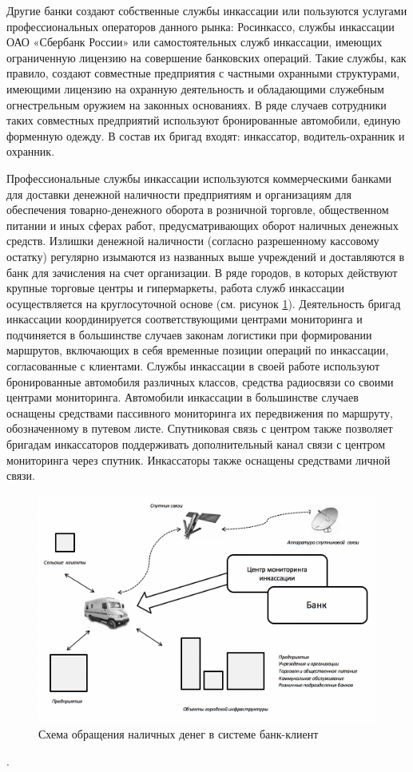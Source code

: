 \documentclass[a4paper,12pt,fleqn]{article} %
\begin{document}
Другие банки создают собственные службы инкассации или пользуются услугами профессиональных операторов данного рынка: Росинкассо, службы инкассации ОАО «Сбербанк России» или самостоятельных служб инкассации, имеющих ограниченную лицензию на совершение банковских операций. Такие службы, как правило, создают совместные предприятия с частными охранными структурами, имеющими лицензию на охранную деятельность и обладающими служебным огнестрельным оружием на законных основаниях. В ряде случаев сотрудники таких совместных предприятий используют бронированные автомобили, единую форменную одежду. В состав их бригад входят: инкассатор, водитель-охранник и охранник.

Профессиональные службы инкассации используются коммерческими банками для доставки денежной наличности предприятиям и организациям для обеспечения товарно-денежного оборота в розничной торговле, общественном питании и иных сферах работ, предусматривающих оборот наличных денежных средств. Излишки денежной наличности (согласно разрешенному кассовому остатку) регулярно изымаются из названных выше учреждений и доставляются в банк для зачисления на счет организации. В ряде городов, в которых действуют крупные торговые центры и гипермаркеты, работа служб инкассации осуществляется на круглосуточной основе (см. рисунок \ref{image10}). Деятельность бригад инкассации координируется соответствующими центрами мониторинга и подчиняется в большинстве случаев законам логистики при формировании маршрутов, включающих в себя временные позиции операций по инкассации, согласованные с клиентами. Службы инкассации в своей работе используют бронированные автомобиля различных классов, средства радиосвязи со своими центрами мониторинга. Автомобили инкассации в большинстве случаев оснащены средствами пассивного мониторинга их передвижения по маршруту, обозначенному в путевом листе. Спутниковая связь с центром также позволяет бригадам инкассаторов поддерживать дополнительный канал связи с центром мониторинга через спутник. Инкассаторы также оснащены средствами личной связи. 

\begin{figure}[h]
	\centering
	\includegraphics[scale=0.9]{img10}
	\caption{Схема обращения наличных денег в системе банк-клиент}
	\label{image10}
\end{figure}.
\end{document}
